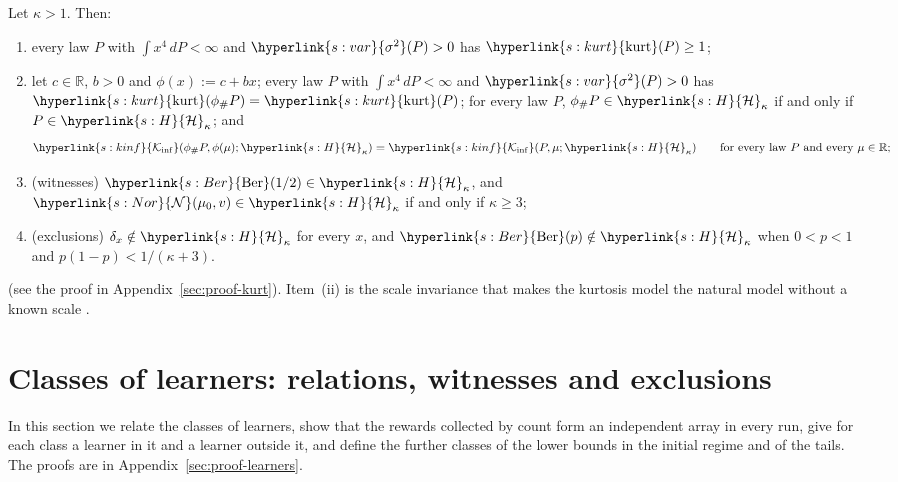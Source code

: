 \documentclass[11pt]{article}
\newcommand{\R}{\mathbb{R}}
\newcommand{\sy}[2]{{\hyperlink{#1}{#2}}}
\newcommand{\Ber}{\sy{s:Ber}{\mathrm{Ber}}}
\newcommand{\Kinf}{\sy{s:kinf}{\mathcal{K}_{\inf}}}
\newcommand{\var}{\sy{s:var}{\sigma^{2}}}
\newcommand{\kurt}{\sy{s:kurt}{\mathrm{kurt}}}
\newcommand{\Hk}{\sy{s:H}{\mathcal{H}}}
\newcommand{\Nor}{\sy{s:Nor}{\mathcal{N}}}
\begin{document}
\begin{lemma}\label{lem:kurt}
Let $\kappa>1$. Then:
\begin{enumerate}[label=(\roman*)]
  \item every law $P$ with $\int x^4\,dP<\infty$ and $\var(P)>0$ has $\kurt(P)\ge1$;
  \item let $c\in\R$, $b>0$ and $\phi(x):=c+bx$; every law $P$ with $\int x^4\,dP<\infty$ and
  $\var(P)>0$ has $\kurt(\phi_\#P)=\kurt(P)$; for every law $P$, $\phi_\#P\in\Hk_\kappa$ if and only if
  $P\in\Hk_\kappa$; and
  \begin{equation*}
    \Kinf(\phi_\#P,\phi(\mu);\Hk_\kappa)=\Kinf(P,\mu;\Hk_\kappa)\qquad\text{for every law }P\text{ and every }\mu\in\R;
  \end{equation*}
  \item (witnesses) $\Ber(1/2)\in\Hk_\kappa$, and $\Nor(\mu_0,v)\in\Hk_\kappa$ if and only if $\kappa\ge3$;
  \item (exclusions) $\delta_x\notin\Hk_\kappa$ for every $x$, and $\Ber(p)\notin\Hk_\kappa$ when
  $0<p<1$ and $p(1-p)<1/(\kappa+3)$.
\end{enumerate}
\end{lemma}
(see the proof in Appendix~\ref{sec:proof-kurt}). Item~(ii) is the scale invariance that makes the
kurtosis model the natural model without a known scale \citep[Assumption~1]{L17}.

\section{Classes of learners: relations, witnesses and exclusions}\label{sec:learners}

In this section we relate the classes of learners, show that the rewards collected by count form an
independent array in every run, give for each class a learner in it and a learner outside it, and
define the further classes of the lower bounds in the initial regime and of the tails.
The proofs are in Appendix~\ref{sec:proof-learners}.
\end{document}

